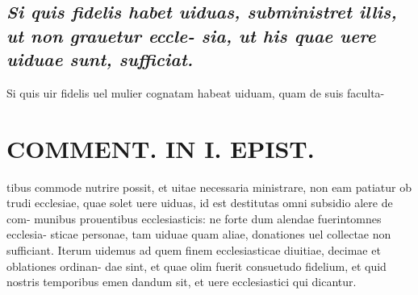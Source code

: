 \documentclass{article}
\begin{document}
\begin{pages}
\subsection*{\textit{Si quis fidelis habet uiduas, subministret illis, ut non grauetur eccle- sia, ut his quae uere uiduae sunt, sufficiat. }}\pstart Si quis uir fidelis uel mulier cognatam habeat uiduam, quam de suis faculta-  \pend
\section*{COMMENT. IN I. EPIST. }
\marginpar{[ p.522 ]}\pstart tibus commode nutrire possit, et uitae necessaria ministrare, non eam patiatur ob trudi ecclesiae, quae solet uere uiduas, id est destitutas omni subsidio alere de com- munibus prouentibus ecclesiasticis: ne forte dum alendae fuerintomnes ecclesia- sticae personae, tam uiduae quam aliae, donationes uel collectae non sufficiant. Iterum uidemus ad quem finem ecclesiasticae diuitiae, decimae et oblationes ordinan- dae sint, et quae olim fuerit consuetudo fidelium, et quid nostris temporibus emen dandum sit, et uere ecclesiastici qui dicantur.  \pend
{}
{}

\end{pages}
\end{document}
